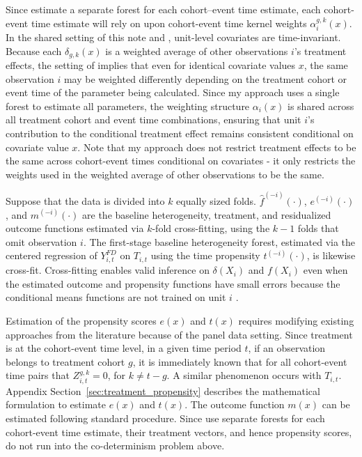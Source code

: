\documentclass[12pt,notitlepage]{article}
\begin{document}
Since \cite{gavrilova_difference--difference_2025} estimate a separate forest for each cohort–event time estimate, each cohort-event time estimate will rely on upon cohort-event time kernel weights $\alpha_i^{g, k}(x)$.
In the shared setting of this note and \cite{gavrilova_difference--difference_2025}, unit-level covariates are time-invariant. 
Because each $\delta_{g, k}(x)$ is a weighted average of other observations $i$'s treatment effects, the setting of \cite{gavrilova_difference--difference_2025} implies that even for identical covariate values $x$, the same observation $i$ may be weighted differently depending on the treatment cohort or event time of the parameter being calculated. 
Since my approach uses a single forest to estimate all parameters, the weighting structure $\alpha_i(x)$ is shared across all treatment cohort and event time combinations, ensuring that unit $i$'s contribution to the conditional treatment effect remains consistent conditional on covariate value $x$. 
Note that my approach does not restrict treatment effects to be the same across cohort-event times conditional on covariates - it only restricts the weights used in the weighted average of other observations to be the same. 

Suppose that the data is divided into $k$ equally sized folds. 
$\hat f^{(-i)}(\cdot)$, $e^{(-i)}(\cdot)$, and $m^{(-i)}(\cdot)$ are the baseline heterogeneity, treatment, and residualized outcome functions estimated via $k$-fold cross-fitting, using the $k-1$ folds that omit observation $i$.
The first-stage baseline heterogeneity forest, estimated via the centered regression of $Y_{i,t}^{FD}$ on $T_{i,t}$ using the time propensity $t^{(-i)}(\cdot)$, is likewise cross-fit.
Cross-fitting enables valid inference on $\delta(X_i)$ and $f(X_i)$ even when the estimated outcome and propensity functions have small errors because the conditional means functions are not trained on unit $i$ \citep{chernozhukov_doubledebiased_2018}.

Estimation of the propensity scores $e(x)$ and $t(x)$ requires modifying existing approaches from the literature because of the panel data setting. 
Since treatment is at the cohort-event time level, in a given time period $t$, if an observation belongs to treatment cohort $g$, it is immediately known that for all cohort-event time pairs that $Z_{i,t}^{g, k} = 0$, for $k \neq t-g$. 
A similar phenomenon occurs with $T_{i, t}$.
Appendix Section~\ref{sec:treatment_propensity} describes the mathematical formulation to estimate $e(x)$ and $t(x)$.
The outcome function $m(x)$ can be estimated following standard procedure. 
Since \cite{gavrilova_difference--difference_2025} use separate forests for each cohort-event time estimate, their treatment vectors, and hence propensity scores, do not run into the co-determinism problem above. 
\end{document}
